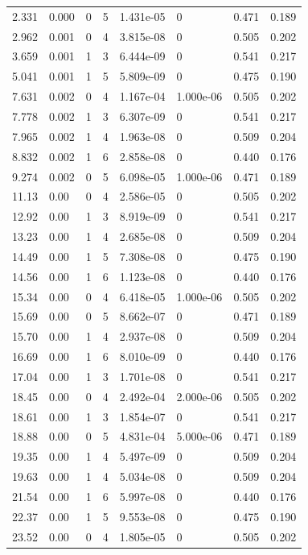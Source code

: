 \documentclass[preview]{standalone}
\begin{document}
{{\begin{tabular}{L{1.2cm}C{1.2cm} C{0.3cm}C{0.5cm} C{1.4cm}C{1.4cm} C{1.4cm}C{1.4cm}}
  2.331  &  0.000  & 0     &  5 &  1.431e-05  & 0  & 0.471 &  0.189   \\ 
  2.962  &  0.001  & 0     &  4 &  3.815e-08  & 0  & 0.505 &  0.202   \\ 
  3.659  &  0.001  & 1     &  3 &  6.444e-09  & 0  & 0.541 &  0.217   \\ 
  5.041  &  0.001  & 1     &  5 &  5.809e-09  & 0  & 0.475 &  0.190   \\ 
  7.631  &  0.002  & 0     &  4 &  1.167e-04  & 1.000e-06  & 0.505 &  0.202   \\ 
  7.778  &  0.002  & 1     &  3 &  6.307e-09  & 0  & 0.541 &  0.217   \\ 
  7.965  &  0.002  & 1     &  4 &  1.963e-08  & 0  & 0.509 &  0.204   \\ 
  8.832  &  0.002  & 1     &  6 &  2.858e-08  & 0  & 0.440 &  0.176   \\ 
  9.274  &  0.002  & 0     &  5 &  6.098e-05  & 1.000e-06  & 0.471 &  0.189   \\ 
  11.13  &  0.00  & 0     &  4 &  2.586e-05  & 0  & 0.505 &  0.202   \\ 
  12.92  &  0.00  & 1     &  3 &  8.919e-09  & 0  & 0.541 &  0.217   \\ 
  13.23  &  0.00  & 1     &  4 &  2.685e-08  & 0  & 0.509 &  0.204   \\ 
  14.49  &  0.00  & 1     &  5 &  7.308e-08  & 0  & 0.475 &  0.190   \\ 
  14.56  &  0.00  & 1     &  6 &  1.123e-08  & 0  & 0.440 &  0.176   \\ 
  15.34  &  0.00  & 0     &  4 &  6.418e-05  & 1.000e-06  & 0.505 &  0.202   \\ 
  15.69  &  0.00  & 0     &  5 &  8.662e-07  & 0  & 0.471 &  0.189   \\ 
  15.70  &  0.00  & 1     &  4 &  2.937e-08  & 0  & 0.509 &  0.204   \\ 
  16.69  &  0.00  & 1     &  6 &  8.010e-09  & 0  & 0.440 &  0.176   \\ 
  17.04  &  0.00  & 1     &  3 &  1.701e-08  & 0  & 0.541 &  0.217   \\ 
  18.45  &  0.00  & 0     &  4 &  2.492e-04  & 2.000e-06  & 0.505 &  0.202   \\ 
  18.61  &  0.00  & 1     &  3 &  1.854e-07  & 0  & 0.541 &  0.217   \\ 
  18.88  &  0.00  & 0     &  5 &  4.831e-04  & 5.000e-06  & 0.471 &  0.189   \\ 
  19.35  &  0.00  & 1     &  4 &  5.497e-09  & 0  & 0.509 &  0.204   \\ 
  19.63  &  0.00  & 1     &  4 &  5.034e-08  & 0  & 0.509 &  0.204   \\ 
  21.54  &  0.00  & 1     &  6 &  5.997e-08  & 0  & 0.440 &  0.176   \\ 
  22.37  &  0.00  & 1     &  5 &  9.553e-08  & 0  & 0.475 &  0.190   \\ 
  23.52  &  0.00  & 0     &  4 &  1.805e-05  & 0  & 0.505 &  0.202   \\ 
\hline 
\end{tabular} 

}}
\end{document}
